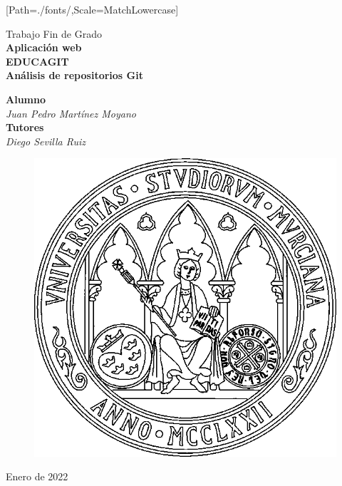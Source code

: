 \documentclass[spanish,11pt,oneside]{scrbook}
\begin{document}
\thispagestyle{empty}
\sloppy

\setmonofont{Inconsolata-Regular.ttf}[Path=./fonts/,Scale=MatchLowercase]

\begin{titlepage}
\thispagestyle{empty}
\vfill\vspace*{1cm}
\begin{center}
{\sc Trabajo Fin de Grado}\\
\vspace{.5cm}
{\huge\sf\bfseries Aplicación web}\\[0.2cm]
{\huge\sf\bfseries EDUCAGIT}\\[0.2cm]
{\huge\sf\bfseries Análisis de repositorios Git}\\[3.3cm]

\begin{large}
{\bf Alumno}\\
\emph{Juan Pedro Martínez Moyano}\\[1cm]

{\bf Tutores}\\
\emph{Diego Sevilla Ruiz} \\
\end{large}
\vfill
\begin{figure}[h!]
\centerline{\includegraphics[width=.35\textwidth]{escudoum.png}}
\end{figure}
\vfill
Enero de 2022
\end{center}
\end{titlepage}
\restoregeometry


\cleardoublepage



\cleardoublepage

\tableofcontents
\cleardoublepage
\end{document}
